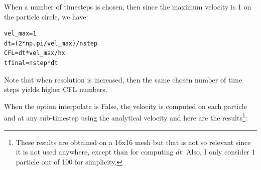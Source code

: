 When a number of timesteps is chosen, then since the maximum velocity is 1 on the particle circle, 
we have:
\begin{lstlisting}
vel_max=1
dt=(2*np.pi/vel_max)/nstep
CFL=dt*vel_max/hx
tfinal=nstep*dt
\end{lstlisting}
Note that when resolution is increased, then the same chosen number of time steps 
yields higher CFL numbers. 


When the option {\python interpolate} is False, the velocity is computed on each particle and at 
any sub-timestep using the analytical velocity and here are the results\footnote{These results are 
obtained on a 16x16 mesh but that is not so relevant since it is not used anywhere, except than 
for computing $dt$. Also, I only consider 1 particle out of 100 for simplicity.}:

